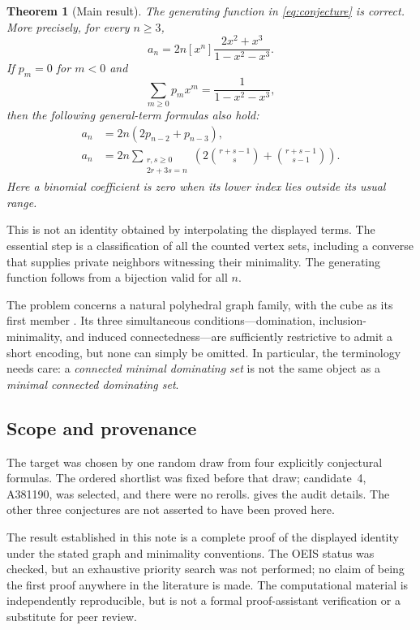 \documentclass[11pt,letterpaper]{article}
\numberwithin{equation}{section}
\newtheorem{theorem}{Theorem}[section]
\theoremstyle{definition}
\theoremstyle{remark}
\newcommand{\coeff}[2]{[#1^{#2}]}
\begin{document}
\begin{theorem}[Main result]\label{thm:main}
The generating function in \eqref{eq:conjecture} is correct. More
precisely, for every $n\ge3$,
\begin{equation}\label{eq:coefficient-main}
\boxed{\displaystyle
 a_n=2n\coeff{x}{n}\frac{2x^2+x^3}{1-x^2-x^3}.}
\end{equation}
If $p_m=0$ for $m<0$ and
\begin{equation}\label{eq:pdef}
 \sum_{m\ge0}p_mx^m=\frac1{1-x^2-x^3},
\end{equation}
then the following general-term formulas also hold:
\begin{align}
 a_n&=2n(2p_{n-2}+p_{n-3}),\label{eq:padovan}\\
 a_n&=2n\!\sum_{\substack{r,s\ge0\\2r+3s=n}}
 \left(2\binom{r+s-1}{s}+\binom{r+s-1}{s-1}\right).
 \label{eq:sum-main}
\end{align}
Here a binomial coefficient is zero when its lower index lies outside
its usual range.
\end{theorem}

This is not an identity obtained by interpolating the displayed terms.
The essential step is a classification of all the counted vertex sets,
including a converse that supplies private neighbors witnessing their
minimality. The generating function follows from a bijection valid for
all $n$.

The problem concerns a natural polyhedral graph family, with the cube
as its first member \cite{trapezohedral}. Its three simultaneous
conditions---domination, inclusion-minimality, and induced
connectedness---are sufficiently restrictive to admit a short encoding,
but none can simply be omitted. In particular, the terminology needs
care: a \emph{connected minimal dominating set} is not the same object
as a \emph{minimal connected dominating set}.

\subsection{Scope and provenance}
The target was chosen by one random draw from four explicitly
conjectural formulas. The ordered shortlist was fixed before that
draw; candidate~4, A381190, was selected, and there were no rerolls.
 gives the audit details. The other three conjectures
are not asserted to have been proved here.

The result established in this note is a complete proof of the displayed
identity under the stated graph and minimality conventions. The OEIS
status was checked, but an exhaustive priority search was not performed;
no claim of being the first proof anywhere in the literature is made.
The computational material is independently reproducible, but is not
a formal proof-assistant verification or a substitute for peer review.
\end{document}
